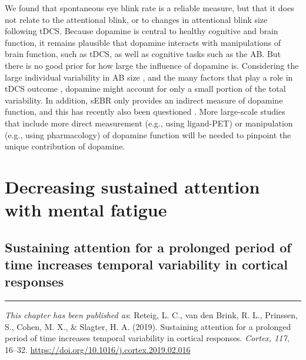 \documentclass[11pt,english,]{memoir}
\begin{document}
We found that spontaneous eye blink rate is a reliable measure, but that it does not relate to the attentional blink, or to changes in attentional blink size following tDCS. Because dopamine is central to healthy cognitive and brain function, it remains plausible that dopamine interacts with manipulations of brain function, such as tDCS, as well as cognitive tasks such as the AB. But there is no good prior for how large the influence of dopamine is. Considering the large individual variability in AB size \autocite{Willems2016}, and the many factors that play a role in tDCS outcome \autocites{Li2015b}{Krause2014}, dopamine might account for only a small portion of the total variability. In addition, sEBR only provides an indirect measure of dopamine function, and this has recently also been questioned \autocites{Dang2017}{Sescousse2018}. More large-scale studies that include more direct measurement (e.g., using ligand-PET) or manipulation (e.g., using pharmacology) of dopamine function will be needed to pinpoint the unique contribution of dopamine.

\hypertarget{part-MF}{%
\part{Decreasing sustained attention with mental fatigue}\label{part-MF}}

\hypertarget{MFBrain}{%
\chapter{Sustaining attention for a prolonged period of time increases temporal variability in cortical responses}\label{MFBrain}}


\vspace*{\fill}

\begin{center}\rule{0.5\linewidth}{\linethickness}\end{center}

\small

\noindent
\emph{This chapter has been published as}: Reteig, L. C., van den Brink, R. L., Prinssen, S., Cohen, M. X., \& Slagter, H. A. (2019). Sustaining attention for a prolonged period of time increases temporal variability in cortical responses. \emph{Cortex, 117}, 16--32. \url{https://doi.org/10.1016/j.cortex.2019.02.016}
\newpage
\normalsize
\end{document}
